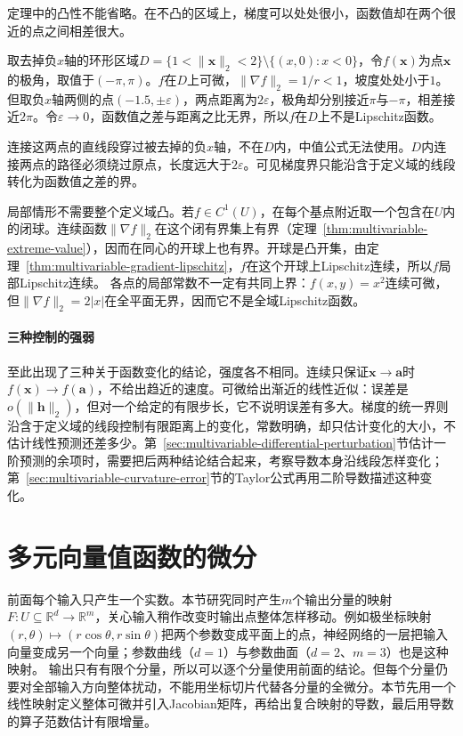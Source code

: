 定理中的凸性不能省略。在不凸的区域上，梯度可以处处很小，函数值却在两个很近的点之间相差很大。
\begin{example}[非凸区域上梯度有界而不Lipschitz]
\label{ex:multivariable-nonconvex-lipschitz-failure}
取去掉负$x$轴的环形区域$D=\{1<\lVert\bm x\rVert_2<2\}\setminus\{(x,0):x<0\}$，令$f(\bm x)$为点$\bm x$的极角，取值于$(-\pi,\pi)$。$f$在$D$上可微，$\lVert\nabla f\rVert_2=1/r<1$，坡度处处小于$1$。
但取负$x$轴两侧的点$(-1.5,\pm\varepsilon)$，两点距离为$2\varepsilon$，极角却分别接近$\pi$与$-\pi$，相差接近$2\pi$。令$\varepsilon\to0$，函数值之差与距离之比无界，所以$f$在$D$上不是Lipschitz函数。
\end{example}

连接这两点的直线段穿过被去掉的负$x$轴，不在$D$内，中值公式无法使用。$D$内连接两点的路径必须绕过原点，长度远大于$2\varepsilon$。可见梯度界只能沿含于定义域的线段转化为函数值之差的界。

局部情形不需要整个定义域凸。若$f\in C^1(U)$，在每个基点附近取一个包含在$U$内的闭球。连续函数$\lVert\nabla f\rVert_2$在这个闭有界集上有界（定理~\ref{thm:multivariable-extreme-value}），因而在同心的开球上也有界。开球是凸开集，由定理~\ref{thm:multivariable-gradient-lipschitz}，$f$在这个开球上Lipschitz连续，所以$f$局部Lipschitz连续。
各点的局部常数不一定有共同上界：$f(x,y)=x^2$连续可微，但$\lVert\nabla f\rVert_2=2|x|$在全平面无界，因而它不是全域Lipschitz函数。

\paragraph{三种控制的强弱}
至此出现了三种关于函数变化的结论，强度各不相同。连续只保证$\bm x\to\bm a$时$f(\bm x)\to f(\bm a)$，不给出趋近的速度。可微给出渐近的线性近似：误差是$o(\lVert\bm h\rVert_2)$，但对一个给定的有限步长，它不说明误差有多大。梯度的统一界则沿含于定义域的线段控制有限距离上的变化，常数明确，却只估计变化的大小，不估计线性预测还差多少。第~\ref{sec:multivariable-differential-perturbation}节估计一阶预测的余项时，需要把后两种结论结合起来，考察导数本身沿线段怎样变化；第~\ref{sec:multivariable-curvature-error}节的Taylor公式再用二阶导数描述这种变化。

\section{多元向量值函数的微分}
\label{sec:multivariable-vector-differentiation}

前面每个输入只产生一个实数。本节研究同时产生$m$个输出分量的映射$F:U\subseteq\mathbb R^d\to\mathbb R^m$，关心输入稍作改变时输出点整体怎样移动。例如极坐标映射$(r,\theta)\mapsto(r\cos\theta,r\sin\theta)$把两个参数变成平面上的点，神经网络的一层把输入向量变成另一个向量；参数曲线（$d=1$）与参数曲面（$d=2$、$m=3$）也是这种映射。
输出只有有限个分量，所以可以逐个分量使用前面的结论。但每个分量仍要对全部输入方向整体扰动，不能用坐标切片代替各分量的全微分。本节先用一个线性映射定义整体可微并引入Jacobian矩阵，再给出复合映射的导数，最后用导数的算子范数估计有限增量。

